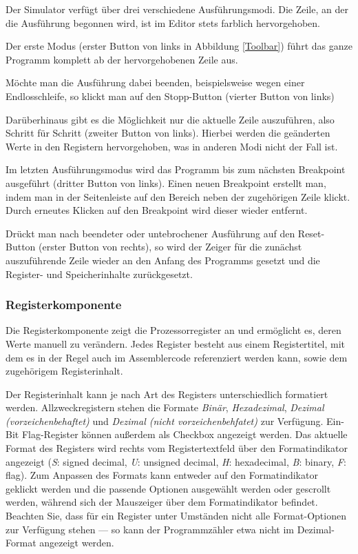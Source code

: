 Der Simulator verfügt über drei verschiedene Ausführungsmodi. Die Zeile, an der die Ausführung begonnen wird, ist im Editor stets farblich hervorgehoben.

Der erste Modus (erster Button von links in Abbildung \ref{Toolbar}) führt das ganze Programm komplett ab der hervorgehobenen Zeile aus.

Möchte man die Ausführung dabei beenden, beispielsweise wegen einer Endlosschleife, so klickt man auf den Stopp-Button (vierter Button von links)

Darüberhinaus gibt es die Möglichkeit nur die aktuelle Zeile auszuführen, also Schritt für Schritt (zweiter Button von links). Hierbei werden die geänderten Werte in den Registern hervorgehoben, was in anderen Modi nicht der Fall ist.

Im letzten Ausführungsmodus wird das Programm bis zum nächsten Breakpoint ausgeführt (dritter Button von links). Einen neuen Breakpoint erstellt man, indem man in der Seitenleiste auf den Bereich neben der zugehörigen Zeile klickt. Durch erneutes Klicken auf den Breakpoint wird dieser wieder entfernt.


Drückt man nach beendeter oder untebrochener Ausführung auf den Reset-Button (erster
Button von rechts), so wird der Zeiger für die zunächst auszuführende Zeile wieder
an den Anfang des Programms gesetzt und die Register- und Speicherinhalte zurückgesetzt.



\subsubsection{Registerkomponente}
Die Registerkomponente zeigt die Prozessorregister an und ermöglicht es, deren Werte manuell zu verändern. Jedes Register besteht aus einem Registertitel, mit dem es in der Regel auch im Assemblercode referenziert werden kann, sowie dem zugehörigem Registerinhalt.

Der Registerinhalt kann je nach Art des Registers unterschiedlich formatiert werden. Allzweckregistern stehen die Formate \textit{Binär}, \textit{Hexadezimal}, \textit{Dezimal (vorzeichenbehaftet)} und \textit{Dezimal (nicht vorzeichenbehfatet)} zur Verfügung. Ein-Bit Flag-Register können außerdem als Checkbox angezeigt werden.
Das aktuelle Format des Registers wird rechts vom Registertextfeld über den Formatindikator angezeigt (\textit{S}: signed decimal, \textit{U}: unsigned decimal, \textit{H}: hexadecimal, \textit{B}: binary, \textit{F}: flag). Zum Anpassen des Formats kann entweder auf den Formatindikator geklickt werden und die passende Optionen ausgewählt werden oder gescrollt werden, während sich der Mauszeiger über dem Formatindikator befindet. Beachten Sie, dass für ein Register unter Umständen nicht alle Format-Optionen zur Verfügung stehen --- so kann der Programmzähler etwa nicht im Dezimal-Format angezeigt werden.

